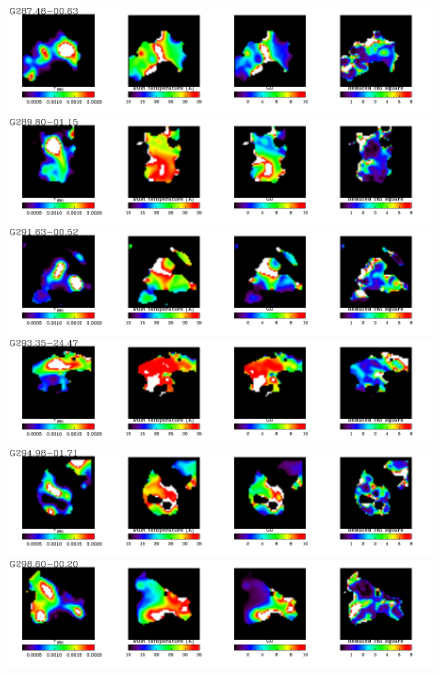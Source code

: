   \begin{figure}
\centering
\includegraphics[trim=0 2mm 0 0, clip, width=190mm]{appA/appA_72.pdf}
\includegraphics[trim=0 2mm 0 0, clip, width=190mm]{appA/appA_73.pdf}
\includegraphics[trim=0 2mm 0 0, clip, width=190mm]{appA/appA_74.pdf}
\includegraphics[trim=0 2mm 0 0, clip, width=190mm]{appA/appA_75.pdf}
\includegraphics[trim=0 2mm 0 0, clip, width=190mm]{appA/appA_76.pdf}
\includegraphics[trim=0 2mm 0 0, clip, width=190mm]{appA/appA_77.pdf}
  \end{figure}
  
